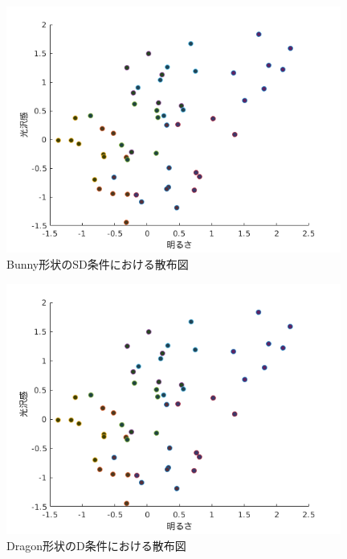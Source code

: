             \begin{figure}[h]
                \centering
                \includegraphics[width=11.0cm]{./img/ex3_BSD.png}
                \caption{Bunny形状のSD条件における散布図}
                \label{ex3_BSD}
            \end{figure}

            \newpage
            \begin{figure}[h]
                \centering
                \includegraphics[width=11.0cm]{./img/ex3_DD.png}
                \caption{Dragon形状のD条件における散布図}
                \label{ex3_DD}
            \end{figure}


